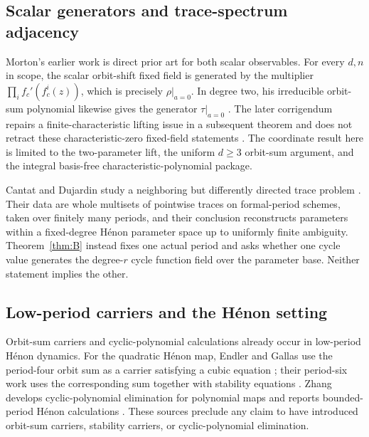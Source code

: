 \documentclass[11pt]{article}
\theoremstyle{definition}
\theoremstyle{remark}
\begin{document}
\subsection{Scalar generators and trace-spectrum adjacency}

Morton's earlier work is direct prior art for both scalar observables.
For every $d,n$ in scope, the scalar orbit-shift fixed field is generated by
the multiplier $\prod_i f_c'(f_c^i(z))$, which is precisely
$\rho|_{a=0}$.  In degree two, his irreducible orbit-sum polynomial likewise
gives the generator $\tau|_{a=0}$
\citep{morton-1996-algebraic-curves}.  The later corrigendum repairs a
finite-characteristic lifting issue in a subsequent theorem and does not
retract these characteristic-zero fixed-field statements
\citep{morton-2011-corrigendum}.  The coordinate result here is limited to
the two-parameter lift, the uniform $d\geq3$ orbit-sum argument, and the
integral basis-free characteristic-polynomial package.

Cantat and Dujardin study a neighboring but differently directed trace
problem \citep{cantat-dujardin-2026-multiplier-rigidity}.  Their data are
whole multisets of pointwise traces on formal-period schemes, taken over
finitely many periods, and their conclusion reconstructs parameters within
a fixed-degree H\'{e}non parameter space up to uniformly finite ambiguity.
Theorem~\ref{thm:B} instead
fixes one actual period and asks whether one cycle value generates the
degree-$r$ cycle function field over the parameter base.  Neither statement
implies the other.

\subsection{Low-period carriers and the H\'{e}non setting}

Orbit-sum carriers and cyclic-polynomial calculations already occur in
low-period H\'{e}non dynamics.  For the quadratic H\'{e}non map, Endler and
Gallas use the period-four orbit sum as a carrier satisfying a cubic equation
\citep{endler-gallas-2002-arithmetical-signatures}; their period-six work
uses the corresponding sum together with stability equations
\citep{endler-gallas-2004-ghost-orbits}.  Zhang develops cyclic-polynomial
elimination for polynomial maps and reports bounded-period H\'{e}non
calculations \citep{zhang-2014-cycles-logistic-map}.  These sources preclude
any claim to have introduced orbit-sum carriers, stability carriers, or
cyclic-polynomial elimination.
\end{document}
